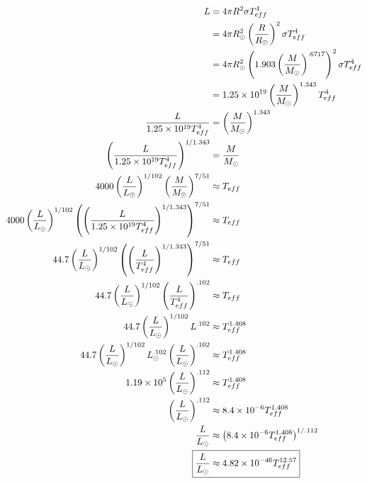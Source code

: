 \documentclass[10pt,letter,preprint]{aastex}
\newcommand{\lp}{\left(}
\newcommand{\rp}{\right)}
\begin{document}
\begin{align}
L & = 4 \pi R^2 \sigma T_{eff}^4\\
& = 4 \pi R_\odot^2 \lp\frac{R}{R_\odot} \rp^2 \sigma T_{eff}^4\\
& = 4 \pi R_\odot^2 \lp 1.903 \left( \frac{M}{M_\odot} \right)^{.6717} \rp^2 \sigma T_{eff}^4\\
& = 1.25 \times 10^{19} \lp \frac{M}{M_\odot} \rp^{1.343}T_{eff}^4 \\
\frac{L}{1.25 \times 10^{19} T_{eff}^4} & = \lp \frac{M}{M_\odot} \rp^{1.343}\\
\lp \frac{L}{1.25 \times 10^{19} T_{eff}^4} \rp^{1/1.343} & = \frac{M}{M_\odot} \\
4000 \left( \frac{L}{L_\odot} \right)^{1/102} \left( \frac{M}{M_\odot} \right)^{7/51} & \approx T_{eff}\\
4000 \left( \frac{L}{L_\odot} \right)^{1/102} \left( \lp \frac{L}{1.25 \times 10^{19} T_{eff}^4} \rp^{1/1.343} \right)^{7/51} & \approx T_{eff}\\
44.7 \left( \frac{L}{L_\odot} \right)^{1/102} \left( \lp \frac{L}{ T_{eff}^4} \rp^{1/1.343} \right)^{7/51} & \approx T_{eff}\\
44.7 \left( \frac{L}{L_\odot} \right)^{1/102} \lp \frac{L}{ T_{eff}^4} \rp^{.102}& \approx T_{eff}\\
44.7 \left( \frac{L}{L_\odot} \right)^{1/102} L^{.102} & \approx T_{eff}^{1.408}\\
44.7 \left( \frac{L}{L_\odot} \right)^{1/102} L_\odot^{.102} \lp \frac{L}{L_\odot} \rp^{.102} & \approx T_{eff}^{1.408}\\
1.19 \times 10^{5} \lp \frac{L}{L_\odot} \rp^{.112} & \approx T_{eff}^{1.408}\\
\lp \frac{L}{L_\odot} \rp^{.112} & \approx 8.4 \times 10^{-6} T_{eff}^{1.408}\\
\frac{L}{L_\odot} & \approx \lp 8.4 \times 10^{-6} T_{eff}^{1.408} \rp^{1/.112}\\
\Aboxed{\frac{L}{L_\odot} & \approx 4.82 \times 10^{-46} T_{eff}^{12.57}}
\end{align}
\end{document}
